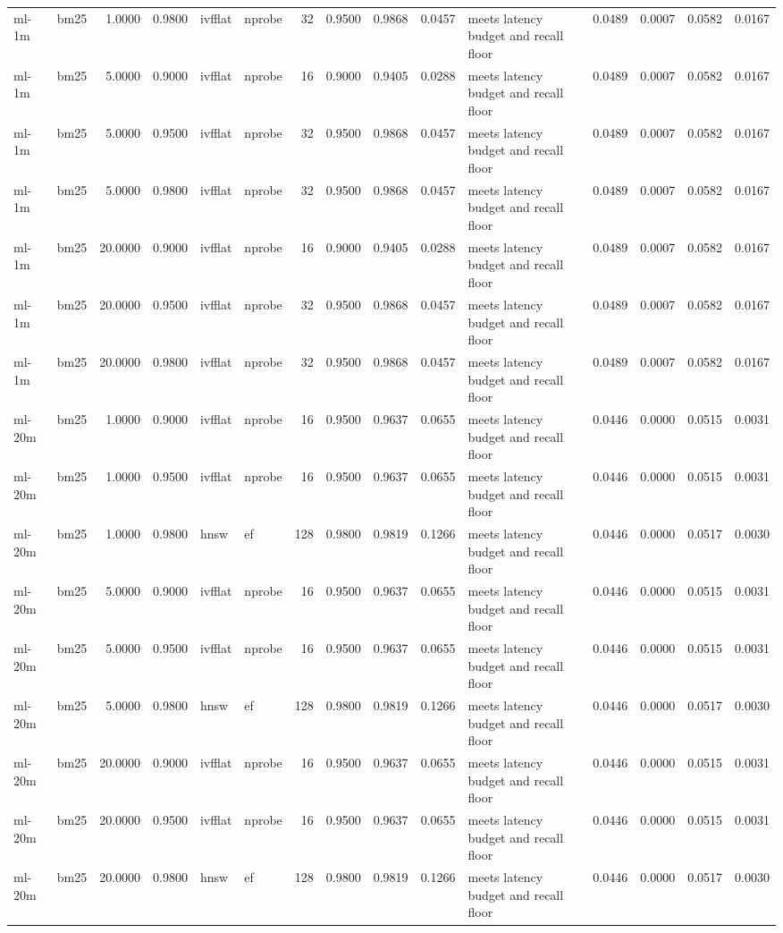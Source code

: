 \begin{tabular}{llrrllrrrrlrrrr}
ml-1m & bm25 & 1.0000 & 0.9800 & ivfflat & nprobe & 32 & 0.9500 & 0.9868 & 0.0457 & meets latency budget and recall floor & 0.0489 & 0.0007 & 0.0582 & 0.0167 \\
ml-1m & bm25 & 5.0000 & 0.9000 & ivfflat & nprobe & 16 & 0.9000 & 0.9405 & 0.0288 & meets latency budget and recall floor & 0.0489 & 0.0007 & 0.0582 & 0.0167 \\
ml-1m & bm25 & 5.0000 & 0.9500 & ivfflat & nprobe & 32 & 0.9500 & 0.9868 & 0.0457 & meets latency budget and recall floor & 0.0489 & 0.0007 & 0.0582 & 0.0167 \\
ml-1m & bm25 & 5.0000 & 0.9800 & ivfflat & nprobe & 32 & 0.9500 & 0.9868 & 0.0457 & meets latency budget and recall floor & 0.0489 & 0.0007 & 0.0582 & 0.0167 \\
ml-1m & bm25 & 20.0000 & 0.9000 & ivfflat & nprobe & 16 & 0.9000 & 0.9405 & 0.0288 & meets latency budget and recall floor & 0.0489 & 0.0007 & 0.0582 & 0.0167 \\
ml-1m & bm25 & 20.0000 & 0.9500 & ivfflat & nprobe & 32 & 0.9500 & 0.9868 & 0.0457 & meets latency budget and recall floor & 0.0489 & 0.0007 & 0.0582 & 0.0167 \\
ml-1m & bm25 & 20.0000 & 0.9800 & ivfflat & nprobe & 32 & 0.9500 & 0.9868 & 0.0457 & meets latency budget and recall floor & 0.0489 & 0.0007 & 0.0582 & 0.0167 \\
ml-20m & bm25 & 1.0000 & 0.9000 & ivfflat & nprobe & 16 & 0.9500 & 0.9637 & 0.0655 & meets latency budget and recall floor & 0.0446 & 0.0000 & 0.0515 & 0.0031 \\
ml-20m & bm25 & 1.0000 & 0.9500 & ivfflat & nprobe & 16 & 0.9500 & 0.9637 & 0.0655 & meets latency budget and recall floor & 0.0446 & 0.0000 & 0.0515 & 0.0031 \\
ml-20m & bm25 & 1.0000 & 0.9800 & hnsw & ef & 128 & 0.9800 & 0.9819 & 0.1266 & meets latency budget and recall floor & 0.0446 & 0.0000 & 0.0517 & 0.0030 \\
ml-20m & bm25 & 5.0000 & 0.9000 & ivfflat & nprobe & 16 & 0.9500 & 0.9637 & 0.0655 & meets latency budget and recall floor & 0.0446 & 0.0000 & 0.0515 & 0.0031 \\
ml-20m & bm25 & 5.0000 & 0.9500 & ivfflat & nprobe & 16 & 0.9500 & 0.9637 & 0.0655 & meets latency budget and recall floor & 0.0446 & 0.0000 & 0.0515 & 0.0031 \\
ml-20m & bm25 & 5.0000 & 0.9800 & hnsw & ef & 128 & 0.9800 & 0.9819 & 0.1266 & meets latency budget and recall floor & 0.0446 & 0.0000 & 0.0517 & 0.0030 \\
ml-20m & bm25 & 20.0000 & 0.9000 & ivfflat & nprobe & 16 & 0.9500 & 0.9637 & 0.0655 & meets latency budget and recall floor & 0.0446 & 0.0000 & 0.0515 & 0.0031 \\
ml-20m & bm25 & 20.0000 & 0.9500 & ivfflat & nprobe & 16 & 0.9500 & 0.9637 & 0.0655 & meets latency budget and recall floor & 0.0446 & 0.0000 & 0.0515 & 0.0031 \\
ml-20m & bm25 & 20.0000 & 0.9800 & hnsw & ef & 128 & 0.9800 & 0.9819 & 0.1266 & meets latency budget and recall floor & 0.0446 & 0.0000 & 0.0517 & 0.0030 \\
\bottomrule
\end{tabular}

